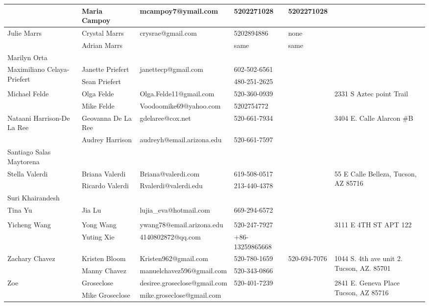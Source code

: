 \documentclass[landscape]{article}\usepackage[]{graphicx}\usepackage[]{color}
\begin{document}
\begin{longtable}{|p{100pt}|p{100pt}|p{140pt}|p{60pt}|p{64pt}|p{120pt}|}
 & Maria Campoy & mcampoy7@ymail.com & 5202271028 & 5202271028 & \\
\hline
\multirow{2}{100pt}{Julie Marrs} & Crystal Marrs & crysrae@gmail.com & 5202894886 & none & \multirow{2}{120pt}{} \\
 & Adrian Marrs &  & same & same & \\
\hline
\multirow{2}{100pt}{Marilyn Orta} &  &  &  &  & \multirow{2}{120pt}{} \\
 &  &  &  &  & \\
\hline
\multirow{2}{100pt}{Maximiliano Celaya-Priefert} & Janette Priefert & janettecp@gmail.com & 602-502-6561 &  & \multirow{2}{120pt}{} \\
 & Sean Priefert &  & 480-251-2625 &  & \\
\hline
\multirow{2}{100pt}{Michael Felde} & Olga Felde & Olga.Felde11@gmail.com & 520-360-0939 &  & \multirow{2}{120pt}{2331 S Aztec point Trail} \\
 & Mike Felde & Voodoomike69@yahoo.com & 5202754772 &  & \\
\hline
\multirow{2}{100pt}{Nataani Harrison-De La Ree} & Geovanna De La Ree & gdelaree@cox.net & 520-661-7934 &  & \multirow{2}{120pt}{3404 E. Calle Alarcon \#B} \\
 & Audrey Harrison & audreyh@email.arizona.edu & 520-661-7597 &  & \\
\hline
\multirow{2}{100pt}{Santiago Salas Maytorena} &  &  &  &  & \multirow{2}{120pt}{} \\
 &  &  &  &  & \\
\hline
\multirow{2}{100pt}{Stella Valerdi} & Briana Valerdi & Briana@valerdi.com & 619-508-0517 &  & \multirow{2}{120pt}{55 E Calle Belleza, Tucson, AZ 85716} \\
 & Ricardo Valerdi & Rvalerdi@valerdi.edu & 213-440-4378 &  & \\
\hline
\multirow{2}{100pt}{Suri Khairandesh} &  &  &  &  & \multirow{2}{120pt}{} \\
 &  &  &  &  & \\
\hline
\multirow{2}{100pt}{Tina Yu} & Jia Lu & lujia\_eva@hotmail.com & 669-294-6572 &  & \multirow{2}{120pt}{} \\
 &  &  &  &  & \\
\hline
\multirow{2}{100pt}{Yicheng Wang} & Yong Wang & ywang78@email.arizona.edu & 520-247-7927 &  & \multirow{2}{120pt}{3111 E 4TH ST APT 122} \\
 & Yuting Xie & 4140802872@qq.com & +86-13259865668 &  & \\
\hline
\multirow{2}{100pt}{Zachary Chavez} & Kristen Bloom & Kristen962@gmail.com & 520-780-1659 & 520-694-7076 & \multirow{2}{120pt}{1044 S. 4th ave unit 2. Tucson, AZ. 85701} \\
 & Manny Chavez & manuelchavez596@gmail.com & 520-343-0866 &  & \\
\hline
\multirow{2}{100pt}{Zoe} & Groseclose & desiree.groseclose@gmail.com & 520-401-7239 &  & \multirow{2}{120pt}{2841 E. Geneva Place Tucson, AZ 85716} \\
 & Mike Groseclose & mike.groseclose@gmail.com &  &  & \\
\hline
\end{longtable}
\newpage
\end{document}
